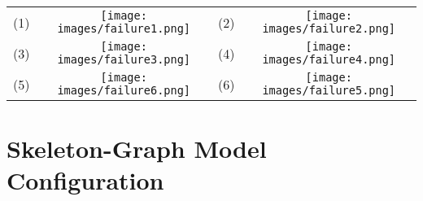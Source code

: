 \documentclass[10pt,twocolumn,letterpaper]{article}
\newcommand*{\ours}{Skeleton-Graph }
\begin{document}
\begin{table*}[ht]
\begin{tabular}{cccc}
(1) & \texttt{[image: images/failure1.png]} & (2)& \texttt{[image: images/failure2.png]}\\
(3) & \texttt{[image: images/failure3.png]} & (4)& \texttt{[image: images/failure4.png]} \\
(5) & \texttt{[image: images/failure6.png]} & (6) & \texttt{[image: images/failure5.png]} \\

\end{tabular}
\caption{Several failure cases predicted by \ours. The \textcolor{green}{green skeletons represents ground-truth} and \textcolor{red}{red skeleton represents prediction}. The deeper color the skeleton is, the earlier moment it is corresponding to. }
\label{tab:failure}
\end{table*}


\section{\ours Model Configuration}
\end{document}
